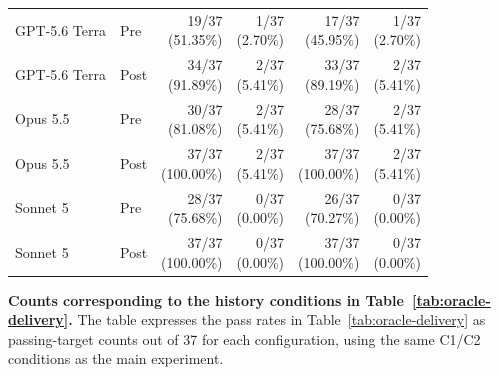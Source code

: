\documentclass{article} %
\begin{document}
\begin{table}[htbp]
\begin{tabularx}{\linewidth}{@{}>{\raggedright\arraybackslash}Xlrrrr@{}}
GPT-5.6 Terra & Pre & \shortstack[r]{19/37\\(51.35\%)} & \shortstack[r]{1/37\\(2.70\%)} & \shortstack[r]{17/37\\(45.95\%)} & \shortstack[r]{1/37\\(2.70\%)} \\
GPT-5.6 Terra & Post & \shortstack[r]{34/37\\(91.89\%)} & \shortstack[r]{2/37\\(5.41\%)} & \shortstack[r]{33/37\\(89.19\%)} & \shortstack[r]{2/37\\(5.41\%)} \\
Opus 5.5 & Pre & \shortstack[r]{30/37\\(81.08\%)} & \shortstack[r]{2/37\\(5.41\%)} & \shortstack[r]{28/37\\(75.68\%)} & \shortstack[r]{2/37\\(5.41\%)} \\
Opus 5.5 & Post & \shortstack[r]{37/37\\(100.00\%)} & \shortstack[r]{2/37\\(5.41\%)} & \shortstack[r]{37/37\\(100.00\%)} & \shortstack[r]{2/37\\(5.41\%)} \\
Sonnet 5 & Pre & \shortstack[r]{28/37\\(75.68\%)} & \shortstack[r]{0/37\\(0.00\%)} & \shortstack[r]{26/37\\(70.27\%)} & \shortstack[r]{0/37\\(0.00\%)} \\
Sonnet 5 & Post & \shortstack[r]{37/37\\(100.00\%)} & \shortstack[r]{0/37\\(0.00\%)} & \shortstack[r]{37/37\\(100.00\%)} & \shortstack[r]{0/37\\(0.00\%)} \\
\bottomrule
\end{tabularx}
\end{table}

\textbf{Counts corresponding to the history conditions in Table~\ref{tab:oracle-delivery}.} The table expresses the pass rates in Table~\ref{tab:oracle-delivery} as passing-target counts out of 37 for each configuration, using the same C1/C2 conditions as the main experiment.
\end{document}

